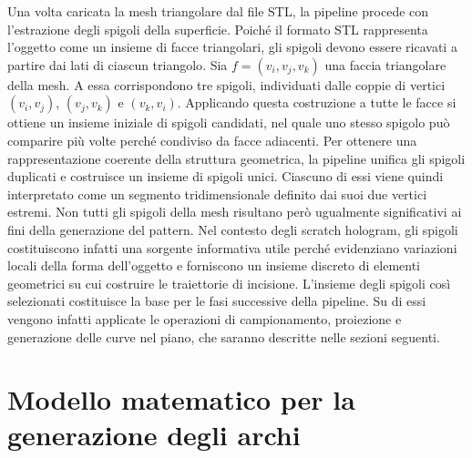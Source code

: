 \documentclass[a4paper,11pt,titlepage,twoside]{book}
\newcommand{\1}{\mathbf{1}}
\numberwithin{equation}{chapter}
\theoremstyle{plain}
\theoremstyle{definition}
\begin{document}
	Una volta caricata la mesh triangolare dal file STL, la pipeline procede con l’estrazione degli spigoli della superficie. Poiché il formato STL rappresenta l’oggetto come un insieme di facce triangolari, gli spigoli devono essere ricavati a partire dai lati di ciascun triangolo\cite{Botsch2010}.
	Sia \(f = (v_i, v_j, v_k)\) una faccia triangolare della mesh. A essa corrispondono tre spigoli, individuati dalle coppie di vertici \((v_i, v_j)\), \((v_j, v_k)\) e \((v_k, v_i)\). Applicando questa costruzione a tutte le facce si ottiene un insieme iniziale di spigoli candidati, nel quale uno stesso spigolo può comparire più volte perché condiviso da facce adiacenti.
	Per ottenere una rappresentazione coerente della struttura geometrica, la pipeline unifica gli spigoli duplicati e costruisce un insieme di spigoli unici. Ciascuno di essi viene quindi interpretato come un segmento tridimensionale definito dai suoi due vertici estremi.
	Non tutti gli spigoli della mesh risultano però ugualmente significativi ai fini della generazione del pattern. Nel contesto degli scratch hologram, gli spigoli costituiscono infatti una sorgente informativa utile perché evidenziano variazioni locali della forma dell’oggetto e forniscono un insieme discreto di elementi geometrici su cui costruire le traiettorie di incisione.
	L’insieme degli spigoli così selezionati costituisce la base per le fasi successive della pipeline. Su di essi vengono infatti applicate le operazioni di campionamento, proiezione e generazione delle curve nel piano, che saranno descritte nelle sezioni seguenti.
	
	
	\section{Modello matematico per la generazione degli archi}
	
\end{document}
